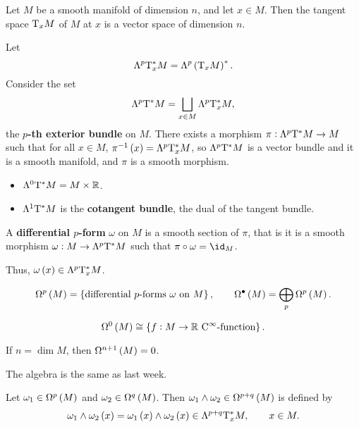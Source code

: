 Let $ M $ be a smooth manifold of dimension $ n $, and let $ x \in M $. Then the tangent space $ \mathrm{T}_xM $ of $ M $ at $ x $ is a vector space of dimension $ n $.

\begin{notation}
Let
$$ \Lambda^p\T_x^*M = \Lambda^p\br{\T_xM}^*. $$
Consider the set
$$ \Lambda^p\mathrm{T}^*M = \bigsqcup_{x \in M} \Lambda^p\mathrm{T}_x^*M, $$
the \textbf{$ p $-th exterior bundle} on $ M $. There exists a morphism $ \pi : \Lambda^p\mathrm{T}^*M \to M $ such that for all $ x \in M $, $ \pi^{-1}\br{x} = \Lambda^p\T_x^*M $, so $ \Lambda^p\mathrm{T}^*M $ is a vector bundle and it is a smooth manifold, and $ \pi $ is a smooth morphism.
\end{notation}

\begin{example}
\hfill
\begin{itemize}
\item $ \Lambda^0\mathrm{T}^*M = M \times \mathbb{R} $.
\item $ \Lambda^1\mathrm{T}^*M $ is the \textbf{cotangent bundle}, the dual of the tangent bundle.
\end{itemize}
\end{example}


\begin{definition}
A \textbf{differential $ p $-form} $ \omega $ on $ M $ is a smooth section of $ \pi $, that is it is a smooth morphism $ \omega : M \to \Lambda^p\mathrm{T}^*M $ such that $ \pi \circ \omega = \id_M $.
\end{definition}

Thus, $ \omega\br{x} \in \Lambda^p\T_x^*M $.

\begin{notation}
$$ \Omega^p\br{M} = \cbr{\text{differential $ p $-forms} \ \omega \ \text{on} \ M}, \qquad \Omega^\bullet\br{M} = \bigoplus_p \Omega^p\br{M}. $$
\end{notation}

\begin{example}
$$ \Omega^0\br{M} \cong \cbr{f : M \to \RR \ \text{$ \C^\infty $-function}}. $$
\end{example}

\begin{exercise*}
If $ n = \dim M $, then $ \Omega^{n + 1}\br{M} = 0 $.
\end{exercise*}

The algebra is the same as last week.

\begin{definition}
Let $ \omega_1 \in \Omega^p\br{M} $ and $ \omega_2 \in \Omega^q\br{M} $. Then $ \omega_1 \wedge \omega_2 \in \Omega^{p + q}\br{M} $ is defined by
$$ \omega_1 \wedge \omega_2\br{x} = \omega_1\br{x} \wedge \omega_2\br{x} \in \Lambda^{p + q}\T_x^*M, \qquad x \in M. $$
\end{definition}


